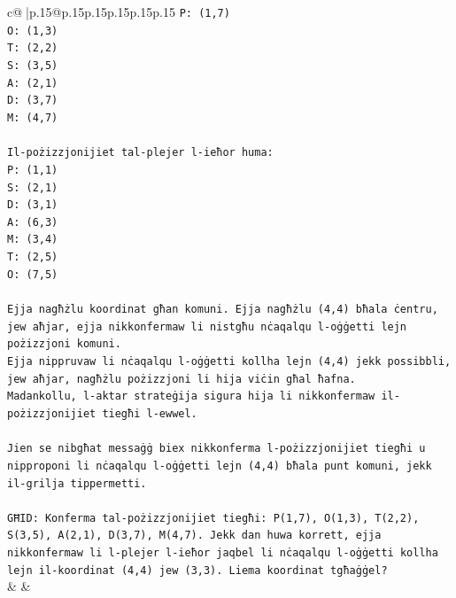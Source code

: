 \documentclass{article}
\begin{document}
{\begin{supertabular}{c@{$\;$}|p{.15\linewidth}@{}p{.15\linewidth}p{.15\linewidth}p{.15\linewidth}p{.15\linewidth}p{.15\linewidth}}
{{{\texttt{P: (1,7)} \\
\texttt{O: (1,3)} \\
\texttt{T: (2,2)} \\
\texttt{S: (3,5)} \\
\texttt{A: (2,1)} \\
\texttt{D: (3,7)} \\
\texttt{M: (4,7)} \\
\\ 
\texttt{Il{-}pożizzjonijiet tal{-}plejer l{-}ieħor huma:} \\
\texttt{P: (1,1)} \\
\texttt{S: (2,1)} \\
\texttt{D: (3,1)} \\
\texttt{A: (6,3)} \\
\texttt{M: (3,4)} \\
\texttt{T: (2,5)} \\
\texttt{O: (7,5)} \\
\\ 
\texttt{Ejja nagħżlu koordinat għan komuni. Ejja nagħżlu (4,4) bħala ċentru, jew aħjar, ejja nikkonfermaw li nistgħu nċaqalqu l{-}oġġetti lejn pożizzjoni komuni.} \\
\texttt{Ejja nippruvaw li nċaqalqu l{-}oġġetti kollha lejn (4,4) jekk possibbli, jew aħjar, nagħżlu pożizzjoni li hija viċin għal ħafna.} \\
\texttt{Madankollu, l{-}aktar strateġija sigura hija li nikkonfermaw il{-}pożizzjonijiet tiegħi l{-}ewwel.} \\
\\ 
\texttt{Jien se nibgħat messaġġ biex nikkonferma l{-}pożizzjonijiet tiegħi u nipproponi li nċaqalqu l{-}oġġetti lejn (4,4) bħala punt komuni, jekk il{-}grilja tippermetti.} \\
\\ 
\texttt{GĦID: Konferma tal{-}pożizzjonijiet tiegħi: P(1,7), O(1,3), T(2,2), S(3,5), A(2,1), D(3,7), M(4,7). Jekk dan huwa korrett, ejja nikkonfermaw li l{-}plejer l{-}ieħor jaqbel li nċaqalqu l{-}oġġetti kollha lejn il{-}koordinat (4,4) jew (3,3). Liema koordinat tgħaġġel?} \\
            }
        }
    }
    & & \\ \\


\end{supertabular}}
\end{document}

